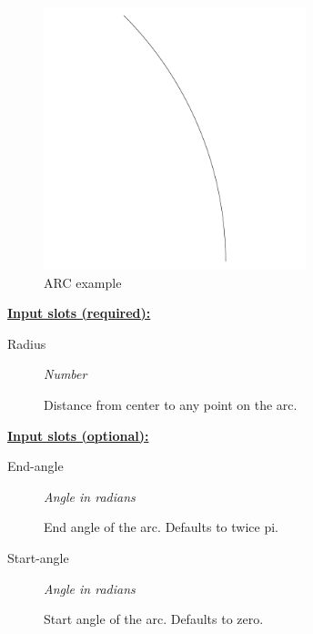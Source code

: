 \documentclass [11pt]{book}
\begin{document}
\begin{itemize}
\begin{figure}
\begin{center}
\includegraphics[width=3in,height=3in]{../images/example-ARC.pdf}
\end{center}

\caption{ARC example}

\label{fig:ARC}

\end{figure}





\textbf{
\underline{Input slots (required):}}

\begin{description}

\item [Radius]
\emph{Number}

 Distance from center to any point on the arc.




\end{description}






\textbf{
\underline{Input slots (optional):}}

\begin{description}

\item [End-angle]
\emph{Angle in radians}

 End angle of the arc. Defaults to twice pi.




\item [Start-angle]
\emph{Angle in radians}

 Start angle of the arc. Defaults to zero.





\end{description}
\end{itemize}
\end{document}
